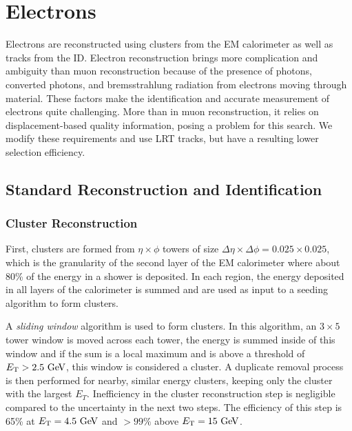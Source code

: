 



\section{Electrons}
\label{sec:elecreco}

Electrons are reconstructed using clusters from the \ac{EM} calorimeter as well as tracks from the \ac{ID}. Electron reconstruction brings more complication and ambiguity than muon reconstruction because of the presence of photons, converted photons, and bremsstrahlung radiation from electrons moving through material. These factors make the identification and accurate measurement of electrons quite challenging. More than in muon reconstruction, it relies on displacement-based quality information, posing a problem for this search. We modify these requirements and use \ac{LRT} tracks, but have a resulting lower selection efficiency. 

\subsection{Standard Reconstruction and Identification}


\subsubsection{Cluster Reconstruction}

First, clusters are formed from $\eta \times \phi$ towers of size $\Delta \eta \times \Delta \phi = 0.025 \times 0.025$, which is the granularity of the second layer of the \ac{EM} calorimeter where about 80\% of the energy in a shower is deposited. In each region, the energy deposited in all layers of the calorimeter is summed and are used as input to a seeding algorithm to form clusters. 

A \emph{sliding window} algorithm is used to form clusters. In this algorithm, an $3 \times 5$ tower window is moved across each tower, the energy is summed inside of this window and if the sum is a local maximum and is above a threshold of $\et > 2.5 \GeV$, this window is considered a cluster. A duplicate removal process is then performed for nearby, similar energy clusters, keeping only the cluster with the largest $E_{T}$. Inefficiency in the cluster reconstruction step is negligible compared to the uncertainty in the next two steps. The efficiency of this step is 65\% at $\et = 4.5 \GeV$ and $> 99\%$ above $\et = 15 \GeV$.

